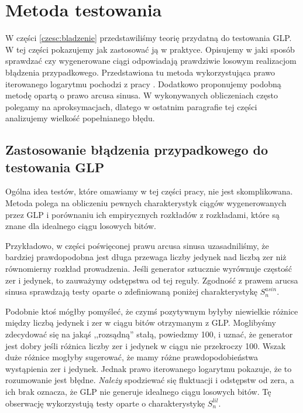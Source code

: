 \documentclass[a4paper,11pt,twoside]{book}
\newcommand{\Slil}[1]{S^{lil}_#1}
\newcommand{\Sasin}[1]{S^{asin}_#1}
\theoremstyle{definition}
\begin{document}
\chapter{Metoda testowania}
\label{czesc:metoda}
W części \ref{czesc:bladzenie} przedstawiliśmy teorię przydatną do testowania GLP. W tej części pokazujemy jak zastosować ją w praktyce. Opisujemy w jaki sposób sprawdzać czy wygenerowane ciągi odpowiadają prawdziwie losowym realizacjom błądzenia przypadkowego. Przedstawiona tu metoda wykorzystująca prawo iterowanego logarytmu pochodzi z pracy \cite{wang-nic}. Dodatkowo proponujemy podobną metodę opartą o prawo arcusa sinusa. W wykonywanych obliczeniach często polegamy na aproksymacjach, dlatego w ostatnim paragrafie tej części analizujemy wielkość popełnianego błędu.



\section{Zastosowanie błądzenia przypadkowego do testowania GLP}

Ogólna idea testów, które omawiamy w tej części pracy, nie jest skomplikowana. Metoda polega na obliczeniu pewnych charakterystyk ciągów wygenerowanych przez GLP i porównaniu ich empirycznych rozkładów z rozkładami, które są znane dla idealnego ciągu losowych bitów.

Przykładowo, w części poświęconej prawu arcusa sinusa uzasadniliśmy, że bardziej prawdopodobna jest długa przewaga liczby jedynek nad liczbą zer niż równomierny rozkład prowadzenia. Jeśli generator sztucznie wyrównuje częstość zer i jedynek, to zauważymy odstępstwa od tej reguły. Zgodność z prawem arucsa sinusa sprawdzają testy oparte o zdefiniowaną poniżej charakterystykę $\Sasin{n}$.

Podobnie ktoś mógłby pomyśleć, że czymś pozytywnym byłyby niewielkie różnice między liczbą jedynek i zer w ciągu bitów otrzymanym z GLP. Moglibyśmy zdecydować się na jakąś ,,rozsądną'' stałą, powiedzmy 100, i uznać, że generator jest dobry jeśli różnica liczby zer i jedynek w ciągu nie przekroczy 100. Wszak duże różnice mogłyby sugerować, że mamy różne prawdopodobieństwa wystąpienia zer i jedynek. Jednak prawo iterowanego logarytmu pokazuje, że to rozumowanie jest błędne. \emph{Należy} spodziewać się fluktuacji i odstępstw od zera, a ich brak oznacza, że GLP nie generuje idealnego ciągu losowych bitów. Tę obserwację wykorzystują testy oparte o charakterystykę $\Slil{n}$.
\end{document}
